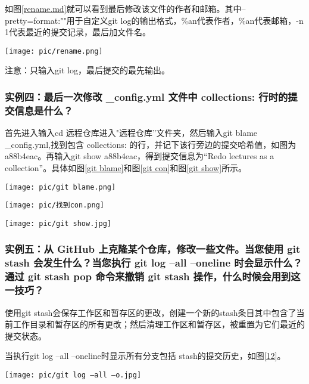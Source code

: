 \documentclass[a4paper]{article}
\begin{document}
如图\ref{rename.md}就可以看到最后修改该文件的作者和邮箱。其中--pretty=format:""用于自定义git log的输出格式，\%an代表作者，\%an代表邮箱，-n 1代表最近的提交记录，最后加文件名。

\begin{figure*}[!ht]
\centering
    \texttt{[image: pic/rename.png]}\caption{git rename.md}\label{rename.md}
\end{figure*}

注意：只输入git log，最后提交的最先输出。

\vspace{1em} 


 \subsubsection{实例四：最后一次修改 \_config.yml 文件中 collections: 行时的提交信息是什么？}

首先进入输入cd 远程仓库{}进入"远程仓库”文件夹，然后输入git blame \_config.yml,找到包含 collections: 的行，并记下该行旁边的提交哈希值，如图为a88b4eac。再输入git show a88b4eac，得到提交信息为“Redo lectures as a collection”。具体如图\ref{git blame}和图\ref{git con}和图\ref{git show}所示。

\begin{figure*}[htb!]
\centering
    \texttt{[image: pic/git blame.png]}\caption{git blame}\label{git blame}
    \texttt{[image: pic/找到con.png]}\caption{find}\label{git con}
    \texttt{[image: pic/git show.jpg]}\caption{git blame}\label{git show}
\end{figure*}

\vspace{1em} 


 \subsubsection{实例五：从 GitHub 上克隆某个仓库，修改一些文件。当您使用 git stash 会发生什么？当您执行 git log --all --oneline 时会显示什么？通过 git stash pop 命令来撤销 git stash 操作，什么时候会用到这一技巧？}

使用git stash会保存工作区和暂存区的更改，创建一个新的stash条目其中包含了当前工作目录和暂存区的所有更改；然后清理工作区和暂存区，被重置为它们最近的提交状态。


当执行git log --all --oneline时显示所有分支包括 stash的提交历史，如图\ref{12}。
\begin{figure*}[!htb]
    \centering
    \texttt{[image: pic/git log --all --o.jpg]}
    \caption{git log --all --oneline}
    \label{12}
\end{figure*}
\end{document}
